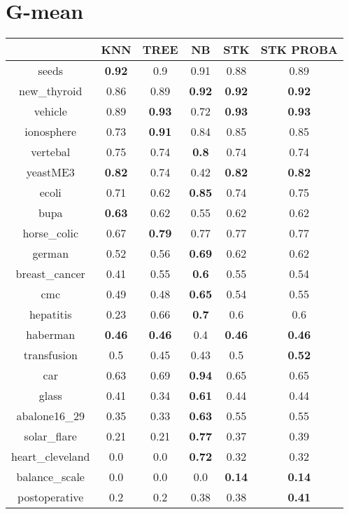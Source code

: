 \documentclass{article}%
\begin{document}
\section*{G{-}mean}%
\begin{tabular}{c|ccccc}%
&KNN&TREE&NB&STK&STK PROBA\\%
\hline%
seeds&\textbf{0.92}&0.9&0.91&0.88&0.89\\%
new\_thyroid&0.86&0.89&\textbf{0.92}&\textbf{0.92}&\textbf{0.92}\\%
vehicle&0.89&\textbf{0.93}&0.72&\textbf{0.93}&\textbf{0.93}\\%
ionosphere&0.73&\textbf{0.91}&0.84&0.85&0.85\\%
vertebal&0.75&0.74&\textbf{0.8}&0.74&0.74\\%
yeastME3&\textbf{0.82}&0.74&0.42&\textbf{0.82}&\textbf{0.82}\\%
ecoli&0.71&0.62&\textbf{0.85}&0.74&0.75\\%
bupa&\textbf{0.63}&0.62&0.55&0.62&0.62\\%
horse\_colic&0.67&\textbf{0.79}&0.77&0.77&0.77\\%
german&0.52&0.56&\textbf{0.69}&0.62&0.62\\%
breast\_cancer&0.41&0.55&\textbf{0.6}&0.55&0.54\\%
cmc&0.49&0.48&\textbf{0.65}&0.54&0.55\\%
hepatitis&0.23&0.66&\textbf{0.7}&0.6&0.6\\%
haberman&\textbf{0.46}&\textbf{0.46}&0.4&\textbf{0.46}&\textbf{0.46}\\%
transfusion&0.5&0.45&0.43&0.5&\textbf{0.52}\\%
car&0.63&0.69&\textbf{0.94}&0.65&0.65\\%
glass&0.41&0.34&\textbf{0.61}&0.44&0.44\\%
abalone16\_29&0.35&0.33&\textbf{0.63}&0.55&0.55\\%
solar\_flare&0.21&0.21&\textbf{0.77}&0.37&0.39\\%
heart\_cleveland&0.0&0.0&\textbf{0.72}&0.32&0.32\\%
balance\_scale&0.0&0.0&0.0&\textbf{0.14}&\textbf{0.14}\\%
postoperative&0.2&0.2&0.38&0.38&\textbf{0.41}\\%
\end{tabular}

%
\end{document}
